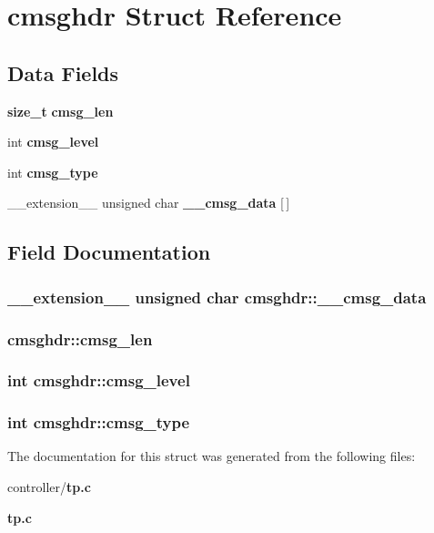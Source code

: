 \section{cmsghdr Struct Reference}
\label{structcmsghdr}
\subsection*{Data Fields}
\begin{DoxyCompactItemize}
\item 
{\bf size\_\-t} {\bf cmsg\_\-len}
\item 
int {\bf cmsg\_\-level}
\item 
int {\bf cmsg\_\-type}
\item 
\_\-\_\-extension\_\-\_\- unsigned char {\bf \_\-\_\-cmsg\_\-data} [$\,$]
\end{DoxyCompactItemize}


\subsection{Field Documentation}
\subsubsection[{\_\-\_\-cmsg\_\-data}]{\setlength{\rightskip}{0pt plus 5cm}\_\-\_\-extension\_\-\_\- unsigned char {\bf cmsghdr::\_\-\_\-cmsg\_\-data}}\label{structcmsghdr_ac1fcac6c2294e1652f386bea40c793f2}
\subsubsection[{cmsg\_\-len}]{ {\bf cmsghdr::cmsg\_\-len}}\label{structcmsghdr_a9d71c5ba999c7db52ec05ae9b702c85c}
\subsubsection[{cmsg\_\-level}]{\setlength{\rightskip}{0pt plus 5cm}int {\bf cmsghdr::cmsg\_\-level}}\label{structcmsghdr_ac0ff1400cb63fbc2e0ece19434cb8fef}
\subsubsection[{cmsg\_\-type}]{\setlength{\rightskip}{0pt plus 5cm}int {\bf cmsghdr::cmsg\_\-type}}\label{structcmsghdr_a4c7cabf7899a688ce10bc92773fca9c1}


The documentation for this struct was generated from the following files:\begin{DoxyCompactItemize}
\item 
controller/{\bf tp.c}\item 
{\bf tp.c}\end{DoxyCompactItemize}
